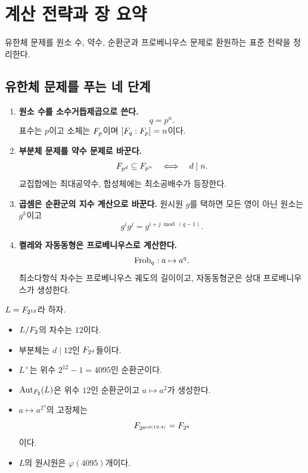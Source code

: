 \section{계산 전략과 장 요약}
\label{sec:finite-field-review}

\begin{learninggoal}
유한체 문제를 원소 수, 약수, 순환군과 프로베니우스 문제로 환원하는 표준 전략을 정리한다.
\end{learninggoal}

\subsection{유한체 문제를 푸는 네 단계}

\begin{enumerate}[label=\textbf{전략 \arabic*.},leftmargin=*]
  \item \textbf{원소 수를 소수거듭제곱으로 쓴다.}
  \[
    q=p^n.
  \]
  표수는 $p$이고 소체는 $F_p$이며 $[F_q:F_p]=n$이다.

  \item \textbf{부분체 문제를 약수 문제로 바꾼다.}
  \[
    F_{p^d}\subseteq F_{p^n}
    \quad\Longleftrightarrow\quad d\mid n.
  \]
  교집합에는 최대공약수, 합성체에는 최소공배수가 등장한다.

  \item \textbf{곱셈은 순환군의 지수 계산으로 바꾼다.}
  원시원 $g$를 택하면 모든 영이 아닌 원소는 $g^k$이고
  \[
    g^ig^j=g^{i+j\bmod(q-1)}.
  \]

  \item \textbf{켤레와 자동동형은 프로베니우스로 계산한다.}
  \[
    \operatorname{Frob}_q:a\mapsto a^q.
  \]
  최소다항식 차수는 프로베니우스 궤도의 길이이고, 자동동형군은 상대 프로베니우스가 생성한다.
\end{enumerate}

\begin{example}[종합 계산]
$L=F_{2^{12}}$라 하자.
\begin{itemize}
  \item $L/F_2$의 차수는 $12$이다.
  \item 부분체는 $d\mid12$인 $F_{2^d}$들이다.
  \item $L^\times$는 위수 $2^{12}-1=4095$인 순환군이다.
  \item $\operatorname{Aut}_{F_2}(L)$은 위수 $12$인 순환군이고 $a\mapsto a^2$가 생성한다.
  \item $a\mapsto a^{2^4}$의 고정체는
  \[
    F_{2^{\gcd(12,4)}}=F_{2^4}
  \]
  이다.
  \item $L$의 원시원은 $\varphi(4095)$개이다.
\end{itemize}
\end{example}

